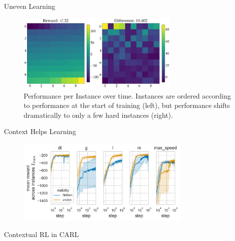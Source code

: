 \documentclass[aspectratio=169]{../latex_main/tntbeamer}  %
\begin{document}
\begin{frame}[c]{Uneven Learning}
	
\begin{figure}
    \centering
    \includegraphics[width=0.7\textwidth]{w09_meta_rl/images/ez_40_5_comb.png}
    \caption{Performance per Instance over time. Instances are ordered according to performance at the start of training (left), but performance shifts dramatically to only a few hard instances (right).}
    \label{fig:my_label}
\end{figure}
	
\end{frame}
\begin{frame}[c]{Context Helps Learning~}

\begin{figure}
    \centering
    \includegraphics[width=0.75\textwidth]{w09_meta_rl/images/CARLPendulumEnv_mean_ep_rew_over_step_visibledtglmmax_speed.png}
    
    \label{fig:my_label}
\end{figure}
\centering Contextual RL in CARL

\end{frame}
\end{document}
